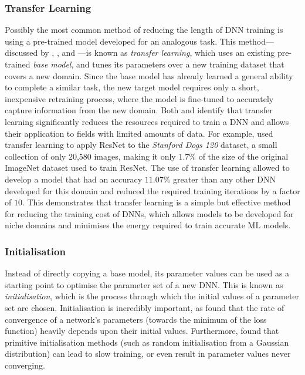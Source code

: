 \documentclass[a4paper, 11pt]{report}
\begin{document}
    \subsubsection{Transfer Learning}

    Possibly the most common method of reducing the length of DNN training is using a pre-trained model developed for an analogous task. This method---discussed by \citet{strubell-2019}, \citet{walsh-2021}, and \citet{schwartz-2019}---is known as \emph{transfer learning}, which uses an existing pre-trained \emph{base model}, and tunes its parameters over a new training dataset that covers a new domain. Since the base model has already learned a general ability to complete a similar task, the new target model requires only a short, inexpensive retraining process, where the model is fine-tuned to accurately capture information from the new domain. Both \citet{strubell-2019} and \citet{walsh-2021} identify that transfer learning significantly reduces the resources required to train a DNN and allows their application to fields with limited amounts of data. For example, \citet{wang-2020} used transfer learning to apply ResNet to the \emph{Stanford Dogs 120} dataset, a small collection of only 20,580 images, making it only $1.7\%$ of the size of the original ImageNet dataset used to train ResNet. The use of transfer learning allowed \citeauthor{wang-2020} to develop a model that had an accuracy $11.07\%$ greater than any other DNN developed for this domain and reduced the required training iterations by a factor of $10$. This demonstrates that transfer learning is a simple but effective method for reducing the training cost of DNNs, which allows models to be developed for niche domains and minimises the energy required to train accurate ML models.


    \subsubsection{Initialisation}

    Instead of directly copying a base model, its parameter values can be used as a starting point to optimise the parameter set of a new DNN. This is known as \emph{initialisation}, which is the process through which the initial values of a parameter set are chosen. Initialisation is incredibly important, as \citet{xu-2021} found that the rate of convergence of a network's parameters (towards the minimum of the loss function) heavily depends upon their initial values. Furthermore, \citet{hanin-2018} found that primitive initialisation methods (such as random initialisation from a Gaussian distribution) can lead to slow training, or even result in parameter values never converging.
\end{document}
